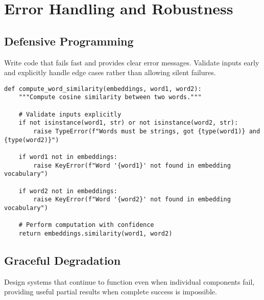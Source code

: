 \documentclass[11pt,a4paper]{article}
\begin{document}
\section{Error Handling and Robustness}

\subsection{Defensive Programming}

Write code that fails fast and provides clear error messages. Validate inputs early and explicitly handle edge cases rather than allowing silent failures.

\begin{lstlisting}[caption=Defensive programming with clear error messages]
def compute_word_similarity(embeddings, word1, word2):
    """Compute cosine similarity between two words."""
    
    # Validate inputs explicitly
    if not isinstance(word1, str) or not isinstance(word2, str):
        raise TypeError(f"Words must be strings, got {type(word1)} and {type(word2)}")
    
    if word1 not in embeddings:
        raise KeyError(f"Word '{word1}' not found in embedding vocabulary")
    
    if word2 not in embeddings:
        raise KeyError(f"Word '{word2}' not found in embedding vocabulary")
    
    # Perform computation with confidence
    return embeddings.similarity(word1, word2)
\end{lstlisting}

\subsection{Graceful Degradation}

Design systems that continue to function even when individual components fail, providing useful partial results when complete success is impossible.
\end{document}
